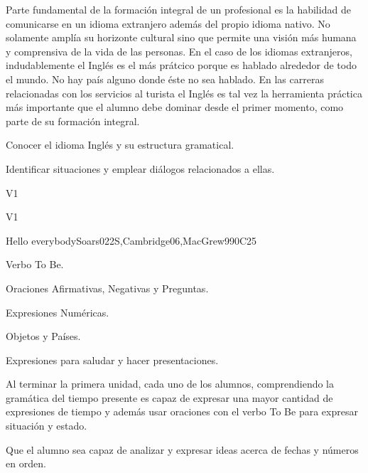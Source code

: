 \begin{syllabus}


\begin{justification}
Parte fundamental de la formación integral de un profesional es la habilidad de comunicarse en un idioma extranjero además del propio idioma nativo. No solamente amplía su horizonte cultural sino que permite una visión más humana y comprensiva de la vida de las personas. En el caso de los idiomas extranjeros, indudablemente el Inglés es el más prátcico porque es hablado alrededor de todo el mundo. No hay país alguno donde éste no sea hablado. En las carreras relacionadas con los servicios al turista el Inglés es tal vez la herramienta práctica más importante que el alumno debe dominar desde el primer momento, como parte de su formación integral.
\end{justification}

\begin{goals}
\item Conocer el idioma Inglés y su estructura gramatical.
\item Identificar situaciones y emplear diálogos relacionados a ellas.
\end{goals}

\begin{outcomes}{V1}
\item {}
\end{outcomes}

\begin{competences}{V1}
    \item {}
\end{competences}

\begin{unit}{Hello everybody}{}{Soars022S,Cambridge06,MacGrew99}{0}{C25}
   \begin{topics}
      \item Verbo To Be.
      \item Oraciones Afirmativas, Negativas y Preguntas.
      \item Expresiones Numéricas.
      \item Objetos y Países.
      \item Expresiones para saludar y hacer presentaciones.
   \end{topics}

   \begin{learningoutcomes}
      \item Al terminar la primera unidad, cada uno de los alumnos, comprendiendo la gramática del tiempo presente es capaz de expresar una mayor cantidad de expresiones de tiempo y además usar oraciones con el verbo To Be para expresar situación y estado. 
      \item Que el alumno sea capaz de analizar y expresar ideas acerca de fechas y números en orden. 
   \end{learningoutcomes}
\end{unit}


\end{syllabus}
